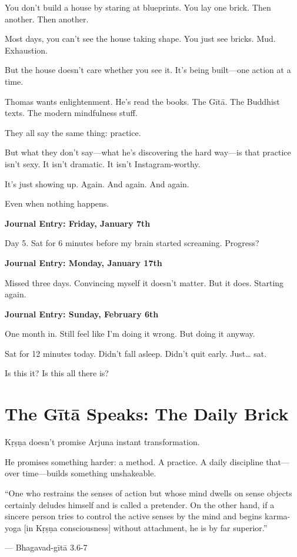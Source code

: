 \documentclass[11pt,twoside]{book}
\begin{document}
You don't build a house by staring at blueprints. You lay one brick. Then another. Then another.

Most days, you can't see the house taking shape. You just see bricks. Mud. Exhaustion.

But the house doesn't care whether you see it. It's being built—one action at a time.

Thomas wants enlightenment. He's read the books. The Gītā. The Buddhist texts. The modern mindfulness stuff.

They all say the same thing: practice.

But what they don't say—what he's discovering the hard way—is that practice isn't sexy. It isn't dramatic. It isn't Instagram-worthy.

It's just showing up. Again. And again. And again.

Even when nothing happens.

\textbf{Journal Entry: Friday, January 7th}

Day 5. Sat for 6 minutes before my brain started screaming. Progress?

\textbf{Journal Entry: Monday, January 17th}

Missed three days. Convincing myself it doesn't matter. But it does. Starting again.

\textbf{Journal Entry: Sunday, February 6th}

One month in. Still feel like I'm doing it wrong. But doing it anyway.

Sat for 12 minutes today. Didn't fall asleep. Didn't quit early. Just\ldots{} sat.

Is this it? Is this all there is?

\section*{The Gītā Speaks: The Daily Brick}

Kṛṣṇa doesn't promise Arjuna instant transformation.

He promises something harder: a method. A practice. A daily discipline that—over time—builds something unshakeable.

\begin{pullquote}
``One who restrains the senses of action but whose mind dwells on sense objects certainly deludes himself and is called a pretender. On the other hand, if a sincere person tries to control the active senses by the mind and begins karma-yoga [in Kṛṣṇa consciousness] without attachment, he is by far superior.''

--- Bhagavad-gītā 3.6-7
\end{pullquote}
\end{document}
